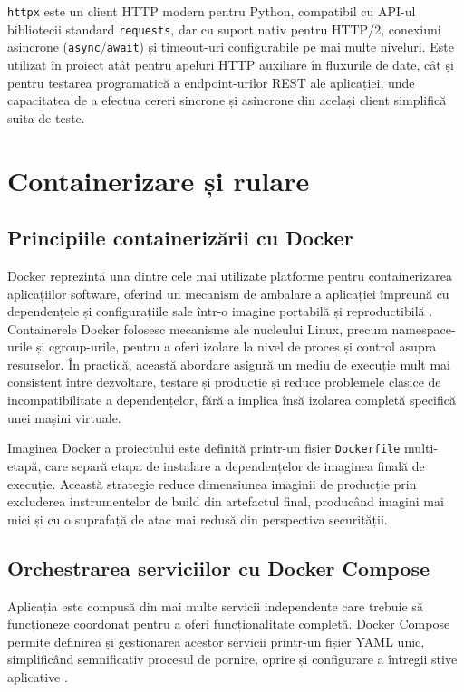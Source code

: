 \documentclass[12pt, a4paper, oneside, romanian]{teza-upb}
\begin{document}
\texttt{httpx} este un client HTTP modern pentru Python, compatibil cu API-ul bibliotecii standard \texttt{requests}, dar cu suport nativ pentru HTTP/2, conexiuni asincrone (\texttt{async}/\texttt{await}) și timeout-uri configurabile pe mai multe niveluri. Este utilizat în proiect atât pentru apeluri HTTP auxiliare în fluxurile de date, cât și pentru testarea programatică a endpoint-urilor REST ale aplicației, unde capacitatea de a efectua cereri sincrone și asincrone din același client simplifică suita de teste.

\section{Containerizare și rulare}

\subsection{Principiile containerizării cu Docker}

Docker reprezintă una dintre cele mai utilizate platforme pentru containerizarea aplicațiilor software, oferind un mecanism de ambalare a aplicației împreună cu dependențele și configurațiile sale într-o imagine portabilă și reproductibilă \cite{docker_doc}. Containerele Docker folosesc mecanisme ale nucleului Linux, precum namespace-urile și cgroup-urile, pentru a oferi izolare la nivel de proces și control asupra resurselor. În practică, această abordare asigură un mediu de execuție mult mai consistent între dezvoltare, testare și producție și reduce problemele clasice de incompatibilitate a dependențelor, fără a implica însă izolarea completă specifică unei mașini virtuale.

Imaginea Docker a proiectului este definită printr-un fișier \texttt{Dockerfile} multi-etapă, care separă etapa de instalare a dependențelor de imaginea finală de execuție. Această strategie reduce dimensiunea imaginii de producție prin excluderea instrumentelor de build din artefactul final, producând imagini mai mici și cu o suprafață de atac mai redusă din perspectiva securității.

\subsection{Orchestrarea serviciilor cu Docker Compose}

Aplicația este compusă din mai multe servicii independente care trebuie să funcționeze coordonat pentru a oferi funcționalitate completă. Docker Compose permite definirea și gestionarea acestor servicii printr-un fișier YAML unic, simplificând semnificativ procesul de pornire, oprire și configurare a întregii stive aplicative \cite{docker_compose_doc}.
\end{document}
